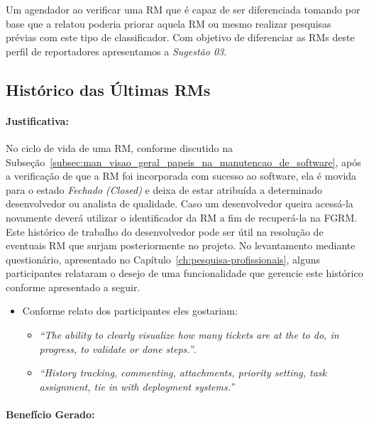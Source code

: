 Um agendador ao verificar uma RM que é capaz de ser diferenciada tomando por
base que a relatou poderia priorar aquela RM ou mesmo realizar pesquisas prévias
com este tipo de classificador. Com objetivo de diferenciar as RMs deste perfil
de reportadores apresentamos a \textit{Sugestão 03}.

\subsection{Histórico das Últimas RMs}
\label{sub:histórico_das_ùltimas_rm_s}


\paragraph{Justificativa:}
\label{par:justificativa_s04}

No ciclo de vida de uma RM, conforme discutido na
Subseção~\ref{subsec:man_visao_geral_papeis_na_manutencao_de_software}, após a
verificação de que a RM foi incorporada com sucesso ao software, ela é movida
para o estado \textit{Fechado (Closed)} e deixa de estar atribuída a determinado
desenvolvedor ou analista de qualidade. Caso um desenvolvedor queira acessá-la
novamente deverá utilizar o identificador da RM a fim de recuperá-la na FGRM\@.
Este histórico de trabalho do desenvolvedor pode ser útil na resolução de
eventuais RM que surjam posteriormente no projeto. No levantamento mediante
questionário, apresentado no Capítulo~\ref{ch:pesquisa-profissionais}, alguns
participantes relataram o desejo de uma funcionalidade  que gerencie este
histórico conforme apresentado a seguir.

\begin{itemize}
	\item Conforme relato dos participantes eles gostariam:
	\begin{itemize}
		\item \textit{``The ability to clearly visualize how many tickets are at
				the to do, in progress, to validate or done steps.''}.
		\item \textit{``History tracking, commenting, attachments, priority
				setting, task assignment, tie in with deployment systems.''}
	\end{itemize}
\end{itemize}

\paragraph{Benefício Gerado:}
\label{par:papéis_afetados_s04}

